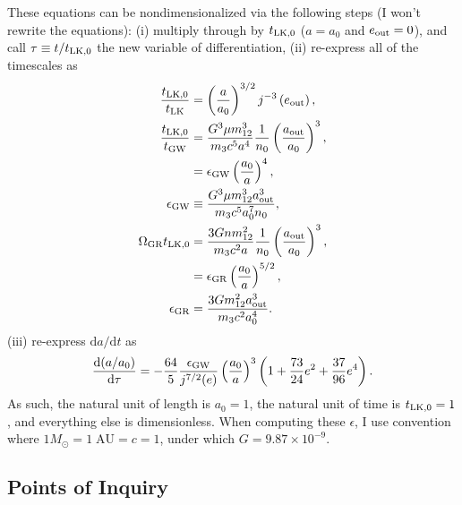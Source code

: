 \documentclass[10pt]{article}%
\newcommand*{\rd}[2]{\frac{\mathrm{d}#1}{\mathrm{d}#2}}
\newcommand*{\rdil}[2]{\mathrm{d}#1 / \mathrm{d}#2}
\newcommand*{\p}[1]{\left(#1\right)}
\begin{document}
These equations can be nondimensionalized via the following steps (I won't
rewrite the equations): (i) multiply through by $t_{\rm LK, 0}$ ($a = a_0$ and
$e_{\rm out} = 0$), and call $\tau \equiv t / t_{\rm LK, 0}$ the new variable of
differentiation, (ii) re-express all of the timescales as
\begin{align}
    \frac{t_{\rm LK, 0}}{t_{\rm LK}} &= \p{\frac{a}{a_0}}^{3/2}
        j^{-3}\p{e_{\rm out}},\\
    \frac{t_{\rm LK, 0}}{t_{\rm GW}} &=
        \frac{G^3\mu m_{12}^3}{m_3c^5a^4}\frac{1}{n_0}\p{\frac{a_{\rm out}
            }{a_0}}^3,\nonumber\\
        &= \epsilon_{\rm GW}\p{\frac{a_0}{a}}^4,\\
    \epsilon_{\rm GW} &\equiv \frac{G^3\mu m_{12}^3
        a_{\rm out}^3}{m_3c^5a_0^7 n_0},\\
    \Omega_{\rm GR}t_{\rm LK, 0} &= \frac{3Gnm_{12}^2}{m_3c^2a}
        \frac{1}{n_0}\p{\frac{a_{\rm out}}{a_0}}^3,\nonumber\\
        &= \epsilon_{\rm GR} \p{\frac{a_0}{a}}^{5/2},\\
    \epsilon_{\rm GR} &= \frac{3Gm_{12}^2a_{\rm out}^3}{m_3c^2a_0^4}.
\end{align}
(iii) re-express $\rdil{a}{t}$ as
\begin{equation}
    \rd{(a / a_0)}{\tau} = -\frac{64}{5}\frac{\epsilon_{\rm GW}}{
        j^{7/2}(e)}\p{\frac{a_0}{a}}^3\p{1 + \frac{73}{24}e^2 +
        \frac{37}{96}e^4}.
\end{equation}
As such, the natural unit of length is $a_0 = 1$, the natural unit of time is
$t_{\rm LK, 0} = 1$, and everything else is dimensionless. When computing these
$\epsilon$, I use convention where $1 M_{\odot} = 1\;\mathrm{AU} = c = 1$, under
which $G = 9.87 \times 10^{-9}$.

\subsection{Points of Inquiry}
\end{document}
